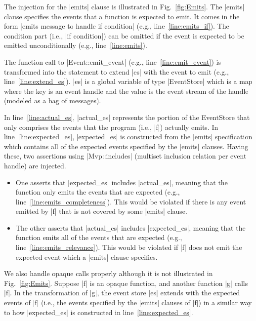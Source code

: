 The injection for the |emits| clause is illustrated in Fig.~\ref{fig:Emits}. The
|emits| clause specifies the events that a function is expected to emit. It
comes in the form |emits message to handle if condition| (e.g.,
line~\ref{line:emits_if}). The condition part (i.e., |if condition|) can be
omitted if the event is expected to be emitted unconditionally (e.g.,
line~\ref{line:emits}).

The function call to |Event::emit_event| (e.g., line~\ref{line:emit_event}) is
transformed into the statement to extend |es| with the event to emit (e.g.,
line~\ref{line:extend_es}). |es| is a global variable of type |EventStore| which
is a map where the key is an event handle and the value is the event stream of
the handle (modeled as a bag of messages).

In line~\ref{line:actual_es}, |actual_es| represents the portion of the
EventStore that only comprises the events that the program (i.e., |f|) actually
emits. In line~\ref{line:expected_es}, |expected_es| is constructed from the
|emits| specification which contains all of the expected events specified by the
|emits| clauses. Having these, two assertions using |Mvp::includes| (multiset
inclusion relation per event handle) are injected.

\begin{itemize}
\item One asserts that |expected_es| includes |actual_es|, meaning that the
  function only emits the events that are expected (e.g.,
  line~\ref{line:emits_completeness}). This would be violated if there is any
  event emitted by |f| that is not covered by some |emits| clause.
\item The other asserts that |actual_es| includes |expected_es|, meaning that
  the function emits all of the events that are expected (e.g.,
  line~\ref{line:emits_relevance}). This would be violated if |f| does not emit
  the expected event which a |emits| clause specifies.
\end{itemize}

We also handle opaque calls properly although it is not illustrated in
Fig.~\ref{fig:Emits}. Suppose |f| is an opaque function, and another function
|g| calls |f|. In the transformation of |g|, the event store |es| extends with
the expected events of |f| (i.e., the events specified by the |emits| clauses of
|f|) in a similar way to how |expected_es| is constructed in
line~\ref{line:expected_es}.

\vspace{-2ex}


